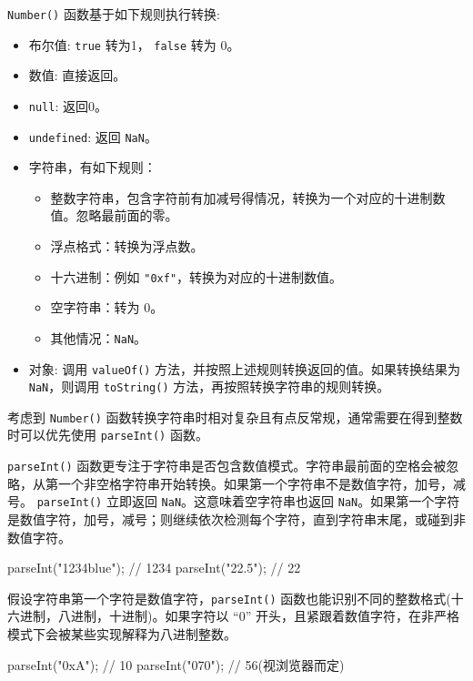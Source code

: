 \texttt{Number()} 函数基于如下规则执行转换:

\begin{itemize}
    \item 布尔值: \texttt{true} 转为1， \texttt{false} 转为 0。
    \item 数值: 直接返回。
    \item \texttt{null}: 返回0。
    \item \texttt{undefined}: 返回 \texttt{NaN}。
    \item 字符串，有如下规则：
    \begin{itemize}
        \item 整数字符串，包含字符前有加减号得情况，转换为一个对应的十进制数值。忽略最前面的零。
        \item 浮点格式：转换为浮点数。
        \item 十六进制：例如 \texttt{"0xf"}，转换为对应的十进制数值。
        \item 空字符串：转为 0。
        \item 其他情况：\texttt{NaN}。
    \end{itemize}
    \item 对象: 调用 \texttt{valueOf()} 方法，并按照上述规则转换返回的值。如果转换结果为 \texttt{NaN}，则调用 \texttt{toString()} 方法，再按照转换字符串的规则转换。
\end{itemize}

考虑到 \texttt{Number()} 函数转换字符串时相对复杂且有点反常规，通常需要在得到整数时可以优先使用 \texttt{parseInt()} 函数。

\texttt{parseInt()} 函数更专注于字符串是否包含数值模式。字符串最前面的空格会被忽略，从第一个非空格字符串开始转换。如果第一个字符串不是数值字符，加号，减号。 \texttt{parseInt()} 立即返回 \texttt{NaN}。这意味着空字符串也返回 \texttt{NaN}。如果第一个字符是数值字符，加号，减号；则继续依次检测每个字符，直到字符串末尾，或碰到非数值字符。

\begin{JavaScript}
parseInt("1234blue");   // 1234
parseInt("22.5");       // 22
\end{JavaScript}

假设字符串第一个字符是数值字符，\texttt {parseInt()} 函数也能识别不同的整数格式(十六进制，八进制，十进制)。如果字符以 ``0'' 开头，且紧跟着数值字符，在非严格模式下会被某些实现解释为八进制整数。

\begin{JavaScript}
parseInt("0xA");        // 10
parseInt("070");        // 56(视浏览器而定)
\end{JavaScript}

